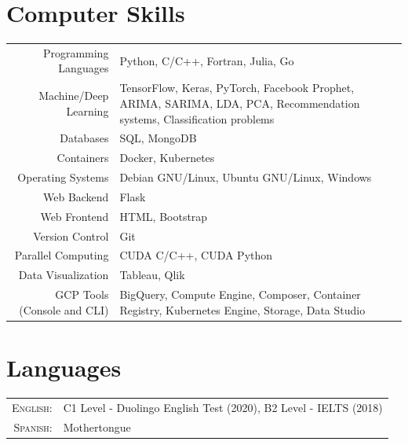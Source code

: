 \documentclass[a4paper,10pt]{article} %
\begin{document}

\section{Computer Skills}
\bigskip
\begin{tabular}{r|p{10.5cm}}
	Programming Languages & Python, C/C++, Fortran, Julia, Go \\
	Machine/Deep Learning & TensorFlow, Keras, PyTorch, Facebook Prophet, ARIMA, SARIMA, LDA, PCA, Recommendation systems, Classification problems\\
	Databases & SQL, MongoDB \\
	Containers & Docker, Kubernetes \\
	Operating Systems & Debian GNU/Linux, Ubuntu GNU/Linux, Windows \\
	Web Backend & Flask \\
	Web Frontend & HTML, Bootstrap \\
	Version Control & Git \\
	Parallel Computing & CUDA C/C++, CUDA Python\\
	Data Visualization & Tableau, Qlik\\
	GCP Tools (Console and CLI) & BigQuery, Compute Engine, Composer, Container Registry, Kubernetes Engine, Storage, Data Studio
\end{tabular}


\section{Languages}
\bigskip
\begin{tabular}{rl}
	\textsc{English:} & C1 Level - Duolingo English Test (2020), B2 Level - IELTS (2018)\\
	
	\textsc{Spanish:} & Mothertongue
\end{tabular}

\end{document}
